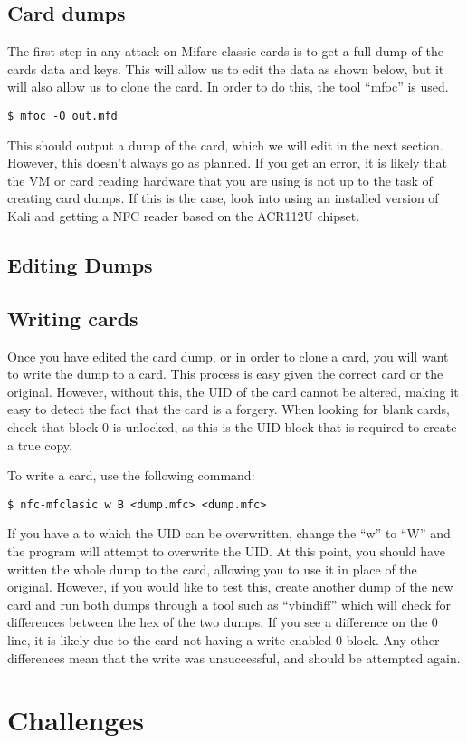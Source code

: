 		\subsection{Card dumps}
			The first step in any attack on Mifare classic cards is to get a full dump of the cards data and keys. 
			This will allow us to edit the data as shown below, but it will also allow us to clone the card. 
			In order to do this, the tool ``mfoc'' is used. 
			\begin{lstlisting}[style=CLI]
				$ mfoc -O out.mfd
			\end{lstlisting}
			This should output a dump of the card, which we will edit in the next section. 
			However, this doesn't always go as planned. 
			If you get an error, it is likely that the VM or card reading hardware that you are using is not up to the task of creating card dumps. 
			If this is the case, look into using an installed version of Kali and getting a NFC reader based on the ACR112U chipset. 
		\subsection{Editing Dumps}
		\subsection{Writing cards}
			Once you have edited the card dump, or in order to clone a card, you will want to write the dump to a card. 
			This process is easy given the correct card or the original. 
			However, without this, the UID of the card cannot be altered, making it easy to detect the fact that the card is a forgery. 
			When looking for blank cards, check that block 0 is unlocked, as this is the UID block that is required to create a true copy. 

			To write a card, use the following command:
			\begin{lstlisting}[style=CLI]
				$ nfc-mfclasic w B <dump.mfc> <dump.mfc> 
			\end{lstlisting}
			If you have a to which the UID can be overwritten, change the ``w'' to ``W'' and the program will attempt to overwrite the UID. 
			At this point, you should have written the whole dump to the card, allowing you to use it in place of the original. 
			However, if you would like to test this, create another dump of the new card and run both dumps through a tool such as ``vbindiff'' which will check for differences between the hex of the two dumps. 
			If you see a difference on the 0 line, it is likely due to the card not having a write enabled 0 block. 
			Any other differences mean that the write was unsuccessful, and should be attempted again. 
	\section{Challenges}
